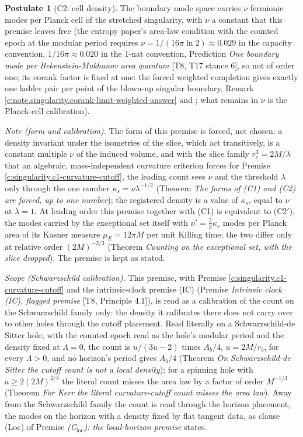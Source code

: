 \documentclass[11pt]{article}
\theoremstyle{definition}
\newtheorem{postulate}[theorem]{Postulate}
\theoremstyle{plain}
\newcommand{\changedmark}[2]{\marginpar{\raggedright\scriptsize\color{#1}#2}}
\begin{document}
\begin{postulate}[C2: cell density]\label{c:singularity.c2-cell-density}
\changedmark{BrickRed}{corrected since the deposit}
The boundary mode space carries $\nu$ fermionic modes per Planck cell of the stretched singularity, with $\nu$ a constant that this premise leaves free (the entropy paper's area-law condition with the counted epoch at the modular period requires $\nu = 1/(16\pi\ln 2) \approx 0.029$ in the capacity convention, $1/16\pi \approx 0.020$ in the 1-nat convention, Prediction \emph{One boundary mode per Bekenstein-Mukhanov area quantum} [T8, T17 stance 6], so not of order one; its corank factor is fixed at one: the forced weighted completion gives exactly one ladder pair per point of the blown-up singular boundary, Remark \ref{c:note.singularity.corank-limit-weighted-answer} and \cite[Thm.~8.7, \S 8.9]{ButlerT4}; what remains in $\nu$ is the Planck-cell calibration).

\emph{Note (form and calibration).} The form of this premise is forced, not chosen: a density invariant under the isometries of the slice, which act transitively, is a constant multiple $\nu$ of the induced volume, and with the slice family $r_c^{3} = 2M/\lambda$ that an algebraic, mass-independent curvature criterion forces for Premise \ref{c:singularity.c1-curvature-cutoff}, the leading count sees $\nu$ and the threshold $\lambda$ only through the one number $\kappa_{s} = \nu\lambda^{-1/2}$ (Theorem \emph{The forms of (C1) and (C2) are forced, up to one number}); the registered density is a value of $\kappa_{s}$, equal to $\nu$ at $\lambda = 1$. At leading order this premise together with (C1) is equivalent to (C2$'$), the modes carried by the exceptional set itself with $\nu' = \tfrac23\kappa_{s}$ modes per Planck area of its Kasner measure $\mu_{E} = 12\pi M$ per unit Killing time; the two differ only at relative order $(2M)^{-2/3}$ (Theorem \emph{Counting on the exceptional set, with the slice dropped}). The premise is kept as stated.

\emph{Scope (Schwarzschild calibration).} This premise, with Premise \ref{c:singularity.c1-curvature-cutoff} and the intrinsic-clock premise (IC) (Premise \emph{Intrinsic clock (IC), flagged premise} [T8, Principle 4.1]), is read as a calibration of the count on the Schwarzschild family only: the density it calibrates there does not carry over to other holes through the cutoff placement. Read literally on a Schwarzschild-de Sitter hole, with the counted epoch read as the hole's modular period and the density fixed at $\Lambda = 0$, the count is $u/(3u - 2)$ times $A_{b}/4$, $u = 2M/r_{b}$, for every $\Lambda > 0$, and no horizon's period gives $A_{b}/4$ (Theorem \emph{On Schwarzschild-de Sitter the cutoff count is not a local density}); for a spinning hole with $a \ge 2(2M)^{2/3}$ the literal count misses the area law by a factor of order $M^{-1/3}$ (Theorem \emph{For Kerr the literal curvature-cutoff count misses the area law}). Away from the Schwarzschild family the count is read through the horizon placement, the modes on the horizon with a density fixed by flat tangent data, as clause (Loc) of Premise \emph{(C$_{\mathrm{loc}}$): the local-horizon premise} states.
\end{postulate}
\end{document}
